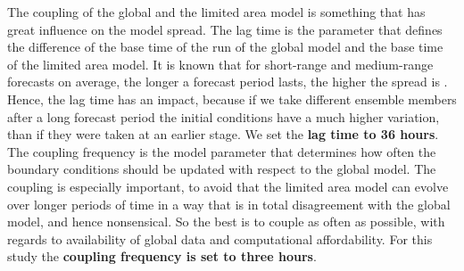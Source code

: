 The coupling of the global and the limited area model is something that has great influence on the model spread. The lag time is the parameter that defines the difference of the base time of the run of the global model and the base time of the limited area model. It is known that for short-range and medium-range forecasts on average, the longer a forecast period lasts, the higher the spread is \cite{buizzaskillspread, bauer2015quiet}. Hence, the lag time has an impact, because if we take different ensemble members after a long forecast period the initial conditions have a much higher variation, than if they were taken at an earlier stage. We set the \textbf{lag time to 36 hours}.
The coupling frequency is the model parameter that determines how often the boundary conditions should be updated with respect to the global model. The coupling is especially important, to avoid that the limited area model can evolve over longer periods of time in a way that is in total disagreement with the global model, and hence nonsensical.
So the best is to couple as often as possible, with regards to availability of global data and computational affordability. For this study the \textbf{coupling frequency is set to three hours}.
